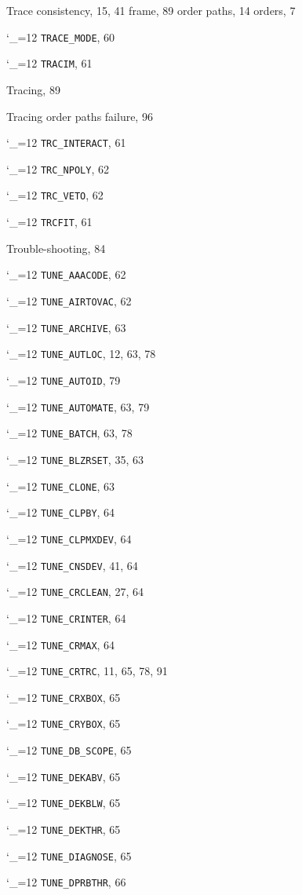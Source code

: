 \documentclass[11pt,twoside]{article}
\newcommand{\cmdname}{\begingroup \catcode`\_=12 \realcmdname}
\newcommand{\realcmdname}[1]{\endgroup\texttt{#1}}
\begin{document}
\begin{theindex}
  \item Trace
    \subitem consistency, 15, 41
    \subitem frame, 89
    \subitem order paths, 14
    \subitem orders, 7
  \item \cmdname {TRACE_MODE}, 60
  \item \cmdname {TRACIM}, 61
  \item Tracing, 89
  \item Tracing order paths
    \subitem failure, 96
  \item \cmdname {TRC_INTERACT}, 61
  \item \cmdname {TRC_NPOLY}, 62
  \item \cmdname {TRC_VETO}, 62
  \item \cmdname {TRCFIT}, 61
  \item Trouble-shooting, 84
  \item \cmdname {TUNE_AAACODE}, 62
  \item \cmdname {TUNE_AIRTOVAC}, 62
  \item \cmdname {TUNE_ARCHIVE}, 63
  \item \cmdname {TUNE_AUTLOC}, 12, 63, 78
  \item \cmdname {TUNE_AUTOID}, 79
  \item \cmdname {TUNE_AUTOMATE}, 63, 79
  \item \cmdname {TUNE_BATCH}, 63, 78
  \item \cmdname {TUNE_BLZRSET}, 35, 63
  \item \cmdname {TUNE_CLONE}, 63
  \item \cmdname {TUNE_CLPBY}, 64
  \item \cmdname {TUNE_CLPMXDEV}, 64
  \item \cmdname {TUNE_CNSDEV}, 41, 64
  \item \cmdname {TUNE_CRCLEAN}, 27, 64
  \item \cmdname {TUNE_CRINTER}, 64
  \item \cmdname {TUNE_CRMAX}, 64
  \item \cmdname {TUNE_CRTRC}, 11, 65, 78, 91
  \item \cmdname {TUNE_CRXBOX}, 65
  \item \cmdname {TUNE_CRYBOX}, 65
  \item \cmdname {TUNE_DB_SCOPE}, 65
  \item \cmdname {TUNE_DEKABV}, 65
  \item \cmdname {TUNE_DEKBLW}, 65
  \item \cmdname {TUNE_DEKTHR}, 65
  \item \cmdname {TUNE_DIAGNOSE}, 65
  \item \cmdname {TUNE_DPRBTHR}, 66

\end{theindex}
\end{document}
